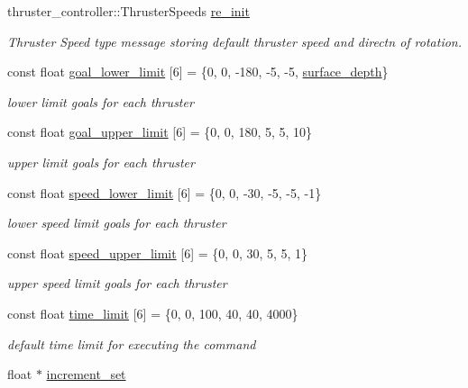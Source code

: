 \begin{DoxyCompactItemize}
thruster\+\_\+controller\+::\+Thruster\+Speeds \hyperlink{classControl_a575ab1b3c33d659078391792285040d9}{re\+\_\+init}
\begin{DoxyCompactList}\small\item\em Thruster Speed type message storing default thruster speed and directn of rotation. \end{DoxyCompactList}\item 
const float \hyperlink{classControl_ae28212c8997ed67f06e82356f8a5e67a}{goal\+\_\+lower\+\_\+limit} \mbox{[}6\mbox{]} = \{0, 0, -\/180, -\/5, -\/5, \hyperlink{classControl_aea3797b8e27792b1d7887b92da69486e}{surface\+\_\+depth}\}
\begin{DoxyCompactList}\small\item\em lower limit goals for each thruster \end{DoxyCompactList}\item 
const float \hyperlink{classControl_a3ec640ae9e440c49fe6c917597487856}{goal\+\_\+upper\+\_\+limit} \mbox{[}6\mbox{]} = \{0, 0, 180, 5, 5, 10\}
\begin{DoxyCompactList}\small\item\em upper limit goals for each thruster \end{DoxyCompactList}\item 
const float \hyperlink{classControl_a8a4e9a6981c6adda2ca45420e7b035b8}{speed\+\_\+lower\+\_\+limit} \mbox{[}6\mbox{]} = \{0, 0, -\/30, -\/5, -\/5, -\/1\}
\begin{DoxyCompactList}\small\item\em lower speed limit goals for each thruster \end{DoxyCompactList}\item 
const float \hyperlink{classControl_a98641c8463a36108205726d108ebf101}{speed\+\_\+upper\+\_\+limit} \mbox{[}6\mbox{]} = \{0, 0, 30, 5, 5, 1\}
\begin{DoxyCompactList}\small\item\em upper speed limit goals for each thruster \end{DoxyCompactList}\item 
const float \hyperlink{classControl_ab6952c55a537ef9c92a874a72d5781b5}{time\+\_\+limit} \mbox{[}6\mbox{]} = \{0, 0, 100, 40, 40, 4000\}
\begin{DoxyCompactList}\small\item\em default time limit for executing the command \end{DoxyCompactList}\item 
float $\ast$ \hyperlink{classControl_abef1251d931160009073651757563fc9}{increment\+\_\+set}

\end{DoxyCompactItemize}
